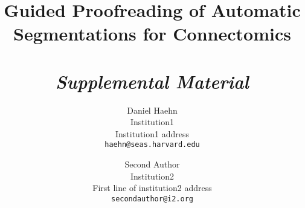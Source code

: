 \documentclass[10pt,twocolumn,letterpaper]{article}
\begin{document}
\title{Guided Proofreading of Automatic Segmentations for Connectomics\\~\\\textit{Supplemental Material}}

\author{Daniel Haehn\\
Institution1\\
Institution1 address\\
{\tt\small haehn@seas.harvard.edu}
\and
Second Author\\
Institution2\\
First line of institution2 address\\
{\tt\small secondauthor@i2.org}
}

\maketitle








{\small


}
\end{document}
